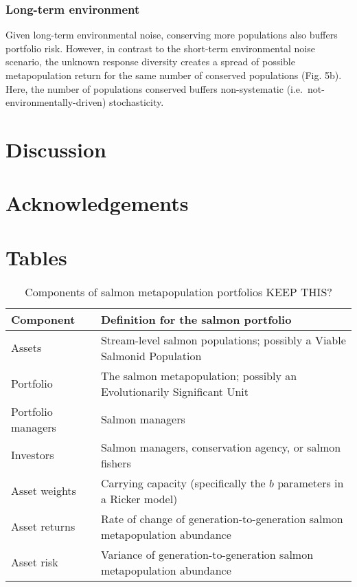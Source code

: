 \subsubsection{Long-term environment}

Given long-term environmental noise, conserving more populations also
buffers portfolio risk. However, in contrast to the short-term
environmental noise scenario, the unknown response diversity creates a
spread of possible metapopulation return for the same number of
conserved populations (Fig. 5b). Here, the number of populations
conserved buffers non-systematic (i.e.~not-environmentally-driven)
stochasticity.

\section{Discussion}

\section{Acknowledgements}





\clearpage

\section{Tables}

\begin{table}[h!]
\centering
\small
\caption{Components of salmon metapopulation portfolios KEEP THIS?}
\begin{tabular}{p{3.6cm}p{7.5cm}}
\toprule
Component          & Definition for the salmon portfolio\\
\midrule
Assets             & Stream-level salmon populations; possibly a Viable Salmonid Population\\
Portfolio          & The salmon metapopulation; possibly an Evolutionarily Significant Unit\\
Portfolio managers & Salmon managers\\
Investors          & Salmon managers, conservation agency, or salmon fishers\\
Asset weights      & Carrying capacity (specifically the $b$ parameters in a Ricker model)\\
Asset returns      & Rate of change of generation-to-generation salmon metapopulation abundance\\
Asset risk         & Variance of generation-to-generation salmon metapopulation abundance\\
\bottomrule
\end{tabular}
\label{t:port}
\end{table}

